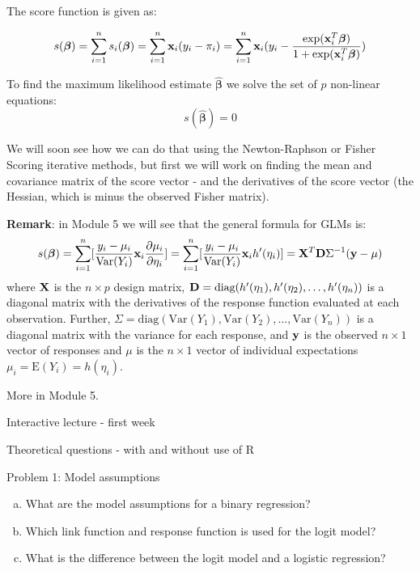 \documentclass[
  ignorenonframetext,
]{beamer}
\providecommand{\tightlist}{%
  \setlength{\itemsep}{0pt}\setlength{\parskip}{0pt}}
\begin{document}
\begin{frame}
The score function is given as:

\[s(\boldsymbol{\beta})=\sum_{i=1}^n s_i(\boldsymbol{\beta})=\sum_{i=1}^n {\bf x}_i (y_i-\pi_i)=\sum_{i=1}^n {\bf x}_i (y_i-\frac{\exp({\bf x}_i^T\boldsymbol{\beta})}{1+\exp({\bf x}_i^T\boldsymbol{\beta})})\]

To find the maximum likelihood estimate \(\hat{\boldsymbol{\beta}}\) we
solve the set of \(p\) non-linear equations:
\[s(\hat{\boldsymbol{\beta}})=0\]

We will soon see how we can do that using the Newton-Raphson or Fisher
Scoring iterative methods, but first we will work on finding the mean
and covariance matrix of the score vector - and the derivatives of the
score vector (the Hessian, which is minus the observed Fisher matrix).
\end{frame}

\begin{frame}
\textbf{Remark}: in Module 5 we will see that the general formula for
GLMs is: \[s(\boldsymbol{\beta})=\sum_{i=1}^n
[\frac{y_i-\mu_i}{\text{Var}(Y_i)}{\bf x}_i \frac{\partial \mu_i}{\partial \eta_i}]=\sum_{i=1}^n
[\frac{y_i-\mu_i}{\text{Var}(Y_i)}{\bf x}_i h'(\eta_i)]={\bf X}^T {\bf D} \Sigma^{-1} ({\bf y} -\mu)\]
where \({\bf X}\) is the \(n\times p\) design matrix,
\({\bf D}=\text{diag}(h'(\eta_1),h'(\eta_2),\ldots,h'(\eta_n))\) is a
diagonal matrix with the derivatives of the response function evaluated
at each observation. Further,
\(\Sigma=\text{diag}(\text{Var}(Y_1),\text{Var}(Y_2),\ldots,\text{Var}(Y_n))\)
is a diagonal matrix with the variance for each response, and
\({\bf y}\) is the observed \(n\times 1\) vector of responses and
\(\mu\) is the \(n\times 1\) vector of individual expectations
\(\mu_i=\text{E}(Y_i)=h(\eta_i)\).

More in Module 5.
\end{frame}

\begin{frame}{Interactive lecture - first week}
\protect\hypertarget{interactive-lecture---first-week}{}
\begin{block}{Theoretical questions - with and without use of R}
\protect\hypertarget{theoretical-questions---with-and-without-use-of-r}{}
\begin{block}{Problem 1: Model assumptions}
\protect\hypertarget{problem-1-model-assumptions}{}
\begin{enumerate}
[a)]
\tightlist
\item
  What are the model assumptions for a binary regression?
\item
  Which link function and response function is used for the logit model?
\item
  What is the difference between the logit model and a logistic
  regression?
\end{enumerate}
\end{block}
\end{block}
\end{frame}
\end{document}

